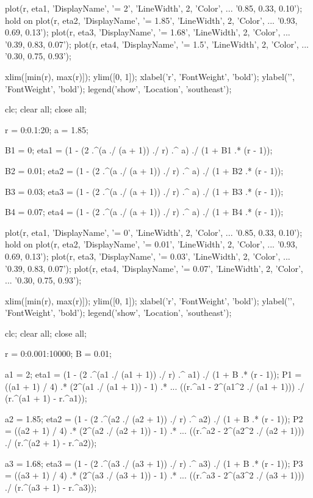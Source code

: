 \begin{verbatim*}
plot(r, eta1, 'DisplayName', '\alpha = 2', 'LineWidth', 2, 'Color', ...
    '0.85, 0.33, 0.10');
hold on
plot(r, eta2, 'DisplayName', '\alpha = 1.85', 'LineWidth', 2, 'Color', ...
    '0.93, 0.69, 0.13');
plot(r, eta3, 'DisplayName', '\alpha = 1.68', 'LineWidth', 2, 'Color', ...
    '0.39, 0.83, 0.07');
plot(r, eta4, 'DisplayName', '\alpha = 1.5', 'LineWidth', 2, 'Color', ...
    '0.30, 0.75, 0.93');

xlim([min(r), max(r)]);
ylim([0, 1]);
xlabel('r', 'FontWeight', 'bold');
ylabel('\eta', 'FontWeight', 'bold');
legend('show', 'Location', 'southeast');

clc; clear all; close all;

r = 0:0.1:20;
a = 1.85;

B1 = 0;
eta1 = (1 - (2 .^(a ./ (a + 1)) ./ r) .^ a) ./ (1 + B1 .* (r - 1));

B2 = 0.01;
eta2 = (1 - (2 .^(a ./ (a + 1)) ./ r) .^ a) ./ (1 + B2 .* (r - 1));

B3 = 0.03;
eta3 = (1 - (2 .^(a ./ (a + 1)) ./ r) .^ a) ./ (1 + B3 .* (r - 1));

B4 = 0.07;
eta4 = (1 - (2 .^(a ./ (a + 1)) ./ r) .^ a) ./ (1 + B4 .* (r - 1));

plot(r, eta1, 'DisplayName', '\beta = 0', 'LineWidth', 2, 'Color', ...
    '0.85, 0.33, 0.10');
hold on
plot(r, eta2, 'DisplayName', '\beta = 0.01', 'LineWidth', 2, 'Color', ...
    '0.93, 0.69, 0.13');
plot(r, eta3, 'DisplayName', '\beta = 0.03', 'LineWidth', 2, 'Color', ...
    '0.39, 0.83, 0.07');
plot(r, eta4, 'DisplayName', '\beta = 0.07', 'LineWidth', 2, 'Color', ...
    '0.30, 0.75, 0.93');

xlim([min(r), max(r)]);
ylim([0, 1]);
xlabel('r', 'FontWeight', 'bold');
ylabel('\eta', 'FontWeight', 'bold');
legend('show', 'Location', 'southeast');

clc; clear all; close all;

r = 0:0.001:10000;
B = 0.01;

a1 = 2;
eta1 = (1 - (2 .^(a1 ./ (a1 + 1)) ./ r) .^ a1) ./ (1 + B .* (r - 1));
P1 = ((a1 + 1) / 4) .* (2^(a1 ./ (a1 + 1)) - 1) .* ...
     ((r.^a1 - 2^(a1^2 ./ (a1 + 1))) ./ (r.^(a1 + 1) - r.^a1));

a2 = 1.85;
eta2 = (1 - (2 .^(a2 ./ (a2 + 1)) ./ r) .^ a2) ./ (1 + B .* (r - 1));
P2 = ((a2 + 1) / 4) .* (2^(a2 ./ (a2 + 1)) - 1) .* ...
     ((r.^a2 - 2^(a2^2 ./ (a2 + 1))) ./ (r.^(a2 + 1) - r.^a2));

a3 = 1.68;
eta3 = (1 - (2 .^(a3 ./ (a3 + 1)) ./ r) .^ a3) ./ (1 + B .* (r - 1));
P3 = ((a3 + 1) / 4) .* (2^(a3 ./ (a3 + 1)) - 1) .* ...
     ((r.^a3 - 2^(a3^2 ./ (a3 + 1))) ./ (r.^(a3 + 1) - r.^a3));


\end{verbatim*}
